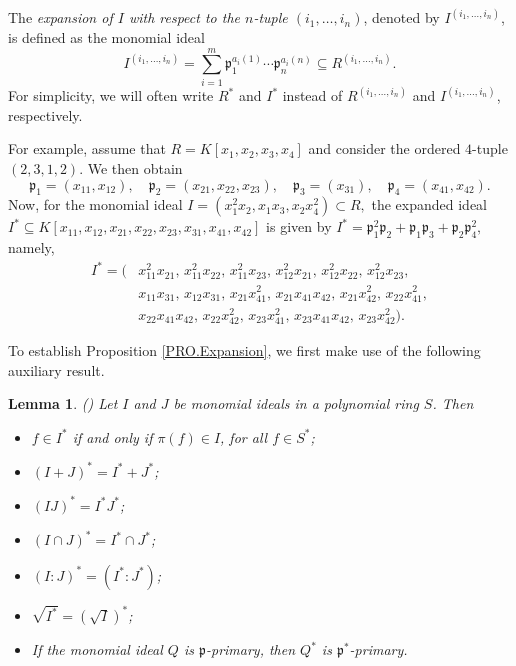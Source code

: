 \documentclass[11pt]{amsart}
\newtheorem{lemma}[theorem]{Lemma}
\begin{document}
The \emph{expansion of $I$ with respect to the $n$-tuple $(i_1, \ldots, i_n)$}, denoted by $I^{(i_1,\ldots,i_n)}$, is defined as the monomial ideal
\[
I^{(i_1,\ldots,i_n)} = \sum_{i=1}^m \mathfrak{p}_1^{a_i(1)} \cdots \mathfrak{p}_n^{a_i(n)} \subseteq R^{(i_1,\ldots,i_n)}.
\]
For simplicity, we will often write $R^*$ and $I^*$ instead of $R^{(i_1,\ldots,i_n)}$ and $I^{(i_1,\ldots,i_n)}$, respectively.\par 
For example, assume that $R = K[x_1, x_2, x_3, x_4]$ and consider the ordered $4$-tuple $(2,3,1,2)$. We then obtain 
\[
\mathfrak{p}_1 = (x_{11}, x_{12}), \quad 
\mathfrak{p}_2 = (x_{21}, x_{22}, x_{23}), \quad
\mathfrak{p}_3 = (x_{31}), \quad
\mathfrak{p}_4 = (x_{41}, x_{42}).
\]
Now, for the monomial ideal  $I = (x_1^2x_2,x_1x_3,x_2x_4^2) \subset R,$  
the expanded ideal $I^* \subseteq K[x_{11}, x_{12}, x_{21}, x_{22}, x_{23}, x_{31}, x_{41}, x_{42}]$ is given by 
 $I^* = \mathfrak{p}_1^2 \mathfrak{p}_2 + \mathfrak{p}_1 \mathfrak{p}_3 + \mathfrak{p}_2 \mathfrak{p}_4^2,$ namely,
\begin{align*}
I^* = (&x_{11}^2 x_{21},\, x_{11}^2 x_{22},\, x_{11}^2 x_{23},\, x_{12}^2 x_{21},\, x_{12}^2 x_{22},\, x_{12}^2 x_{23},\\
& x_{11} x_{31},\, x_{12} x_{31},\, x_{21}x_{41}^2,\, x_{21}x_{41}x_{42},\, x_{21}x_{42}^2,\, x_{22}x_{41}^2,\\
& x_{22}x_{41}x_{42},\, x_{22}x_{42}^2,\, x_{23}x_{41}^2,\, x_{23}x_{41}x_{42},\, x_{23}x_{42}^2 ).
\end{align*}

\bigskip
To establish  Proposition \ref{PRO.Expansion}, we first make use of the following auxiliary result. 

 
\begin{lemma} (\cite [Lemma 1.1]{BH}) \label{Lem.Bayati.Expansion}
Let $I$ and $J$ be monomial ideals in a polynomial ring $S$. Then
\begin{itemize}
\item[(i)] $f \in I^*$ if and only if $\pi(f)\in I$, for all $f\in S^*$;
\item[(ii)] $(I + J)^* = I^* + J^*$;
\item[(iii)] $(IJ)^* = I^*J^*$;
\item[(iv)] $(I \cap J)^* = I^*\cap J^*$;
\item[(v)] $(I : J)^* = (I^* : J^*)$;
\item[(vi)] $\sqrt{I^*} = (\sqrt{I})^*$;
\item[(vii)] If the monomial ideal $Q$ is $\mathfrak{p}$-primary, then $Q^*$ is
$\mathfrak{p}^*$-primary.
\end{itemize}
\end{lemma}
\end{document}
